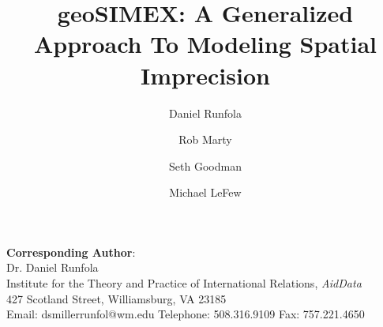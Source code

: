 


\author[1]{Daniel Runfola}
\author[1]{Rob Marty}
\author[1]{Seth Goodman}
\author[1]{Michael LeFew}
\renewcommand\Authands{ and }

\title{geoSIMEX: A Generalized Approach To Modeling Spatial Imprecision}

\usepackage{Sweave}




\maketitle 
\begin{flushleft}
\textbf{Corresponding Author}:\\
Dr. Daniel Runfola\\
Institute for the Theory and Practice of International Relations, \emph{AidData}\\
427 Scotland Street, Williamsburg, VA 23185\\
Email: dsmillerrunfol@wm.edu
Telephone: 508.316.9109
Fax: 757.221.4650
\end{flushleft}


\newpage

\doublespacing

